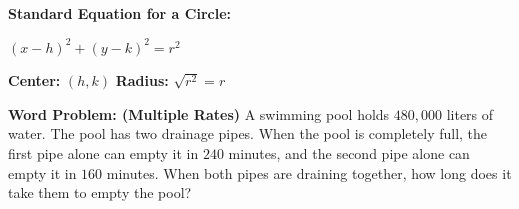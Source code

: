 \documentclass[12pt]{article}
\begin{document}
\textbf{Standard Equation for a Circle:} 
\newline

\centerline{$(x-h)^2+(y-k)^2=r^2$}
\vspace{.5cm}
\centerline{\textbf{Center:} $(h,k)$ \hspace{2cm} \textbf{Radius:} $\sqrt{r^2} = r$}

\vspace{1cm}

\textbf{Word Problem: (Multiple Rates)} A swimming pool holds $480,000$  liters of water. The pool has two drainage pipes. When the pool is completely full, the first pipe alone can empty it in $240$ minutes, and the second pipe alone can empty it in $160$ minutes. When both pipes are draining together, how long does it take them to empty the pool?
\end{document}
